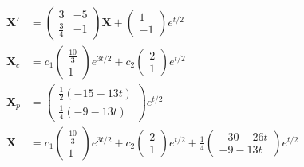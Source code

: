 \documentclass{article}
\begin{document}
\setcounter{subsubsection}{14}
\subsubsection{}

\begin{align*}
  \mathbf{X}'  & = \begin{pmatrix}
                     3           & -5 \\
                     \frac{3}{4} & -1
                   \end{pmatrix} \mathbf{X} + \begin{pmatrix}
                                                1 \\
                                                -1
                                              \end{pmatrix} e^{t / 2}                                                \\
  \mathbf{X}_c & = c_1 \begin{pmatrix}
                         \frac{10}{3} \\
                         1
                       \end{pmatrix} e^{3 t / 2} + c_2 \begin{pmatrix}
                                                         2 \\
                                                         1
                                                       \end{pmatrix} e^{t / 2}                                       \\
  \mathbf{X}_p & = \begin{pmatrix}
                     \frac{1}{2} (-15 - 13 t) \\
                     \frac{1}{4} (-9 - 13 t)
                   \end{pmatrix} e^{t / 2}                                                                          \\
  \mathbf{X}   & = c_1 \begin{pmatrix}
                         \frac{10}{3} \\
                         1
                       \end{pmatrix} e^{3 t / 2} + c_2 \begin{pmatrix}
                                                         2 \\
                                                         1
                                                       \end{pmatrix} e^{t / 2} + \frac{1}{4} \begin{pmatrix}
                                                                                               -30 - 26 t \\
                                                                                               -9 - 13 t
                                                                                             \end{pmatrix} e^{t / 2}
\end{align*}
\end{document}
